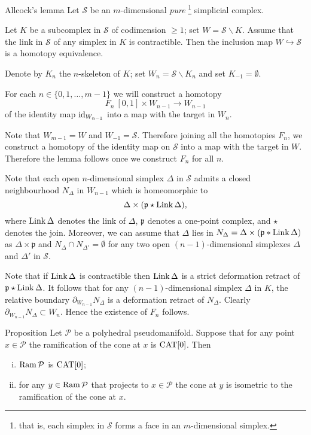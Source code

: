 \documentclass[oneside,a4paper]{article}
\begin{document}
\begin{thm}{Allcock's lemma}\label{lem:allcock}
Let $\mathcal{S}$ be an $m$-dimensional \emph{pure}%
\footnote{that is, each simplex in $\mathcal{S}$ forms a face in an $m$-dimensional simplex.} simplicial complex.

Let $K$ be a subcomplex in $\mathcal{S}$ of codimension $\ge 1$;
set $W=\mathcal{S}\backslash K$.
Assume that the link in  $\mathcal{S}$  of any simplex in $K$ is contractible.
Then the inclusion map $W\hookrightarrow\mathcal{S}$ is a homotopy equivalence.
\end{thm}


Denote by $K_n$ the $n$-skeleton of $K$;
set $W_n=\mathcal{S}\backslash K_n$
and
set $K_{-1}=\emptyset$.

For each $n\in \{0,1,\dots,m-1\}$
we will construct a homotopy
$$F_n\:[0,1]\times W_{n-1}\to W_{n-1}$$
of the identity map $\mathop{\rm id}\nolimits_{W_{n-1}}$
into a map with the target in $W_{n}$.

Note that $W_{m-1}=W$ and $W_{-1}=\mathcal{S}$.
Therefore joining all the homotopies $F_n$,
we construct a  homotopy of the identity map on ${\mathcal{S}}$ into a map with the target in $W$.
Therefore the lemma follows once we construct  $F_n$ for all $n$.

Note that each open $n$-dimensional simplex $\Delta$ in $\mathcal{S}$ admits a closed neighbourhood $N_\Delta$ in $W_{n-1}$ which is homeomorphic to
$$\Delta\times (\mathfrak{p}\star\mathop{\rm Link}\Delta),$$
where $\mathop{\rm Link}\Delta$ denotes the link of $\Delta$,
$\mathfrak{p}$ denotes a one-point complex, and ${\star}$ denotes the join.
Moreover, we can assume that $\Delta$ lies in $N_\Delta=\Delta\times (\mathfrak{p}*\mathop{\rm Link}\Delta)$ as $\Delta\times \mathfrak{p}$
and $N_\Delta\cap N_{\Delta'}=\emptyset$ for any two open $(n-1)$-dimensional simplexes $\Delta$ and $\Delta'$ in $\mathcal{S}$.

Note that if $\mathop{\rm Link}\Delta$ is contractible
then  $\mathop{\rm Link}\Delta$ is a strict deformation retract of $\mathfrak{p}\star\mathop{\rm Link}\Delta$.
It follows that for any $(n-1)$-dimensional simplex $\Delta$ in $K$,
the relative boundary  $\partial_{W_{n-1}}N_\Delta$
is a deformation retract of $N_\Delta$.
Clearly $\partial_{W_{n-1}}N_\Delta\subset W_n$.
Hence the existence of $F_n$ follows.
\qeds


\begin{thm}{Proposition}\label{orbianalog}
Let $\mathcal P$ be a polyhedral pseudomanifold.
Suppose that for any point $x\in \mathcal P$ the ramification of the cone at $x$ is $\mathrm{CAT}[0]$.
Then
\begin{enumerate}[(i)]
\item\label{orbianalog:i} $\mathop{\rm Ram}\nolimits \mathcal P$ is $\mathrm{CAT}[0]$;
\item\label{orbianalog:ii} for any $y\in \mathop{\rm Ram}\nolimits \mathcal P$ that projects to $x\in \mathcal P$
the cone at $y$ is isometric to the ramification of the cone at $x$.
\end{enumerate}
\end{thm}
\end{document}
